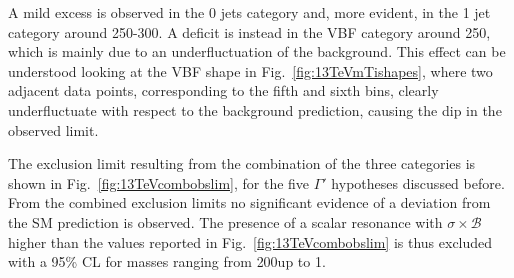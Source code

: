 A mild excess is observed in the 0 jets category and, more evident, in the 1 jet category around 250-300\GeV. A deficit is instead in the VBF category around 250\GeV, which is mainly due to an underfluctuation of the background. This effect can be understood looking at the VBF shape in Fig.~\ref{fig:13TeVmTishapes}, where two adjacent data points, corresponding to the fifth and sixth bins, clearly underfluctuate with respect to the background prediction, causing the dip in the observed limit.

The exclusion limit resulting from the combination of the three categories is shown in Fig.~\ref{fig:13TeVcombobslim}, for the five $\Gamma'$ hypotheses discussed before. From the combined exclusion limits no significant evidence of a deviation from the SM prediction is observed. The presence of a scalar resonance with $\sigma\times\mathcal{B}$ higher than the values reported in Fig.~\ref{fig:13TeVcombobslim} is thus excluded with a 95\% CL for masses ranging from 200\GeV up to 1\TeV.

